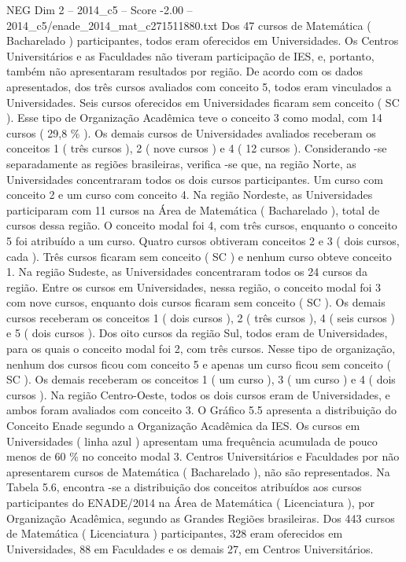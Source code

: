 \begin{textsample}{NEG Dim 2 – 2014\_c5 – Score -2.00 – 2014\_c5/enade\_2014\_mat\_c271511880.txt}
Dos 47 cursos de Matemática ( Bacharelado ) participantes, todos eram oferecidos em Universidades.
Os Centros Universitários e as Faculdades não tiveram participação de IES, e, portanto, também não apresentaram resultados por região.
De acordo com os dados apresentados, dos três cursos avaliados com conceito 5, todos eram vinculados a Universidades.
Seis cursos oferecidos em Universidades ficaram sem conceito ( SC ).
Esse tipo de Organização Acadêmica teve o conceito 3 como modal, com 14 cursos ( 29,8 \% ).
Os demais cursos de Universidades avaliados receberam os conceitos 1 ( três cursos ), 2 ( nove cursos ) e 4 ( 12 cursos ).
Considerando -se separadamente as regiões brasileiras, verifica -se que, na região Norte, as Universidades concentraram todos os dois cursos participantes.
Um curso com conceito 2 e um curso com conceito 4.
Na região Nordeste, as Universidades participaram com 11 cursos na Área de Matemática ( Bacharelado ), total de cursos dessa região.
O conceito modal foi 4, com três cursos, enquanto o conceito 5 foi atribuído a um curso.
Quatro cursos obtiveram conceitos 2 e 3 ( dois cursos, cada ).
Três cursos ficaram sem conceito ( SC ) e nenhum curso obteve conceito 1.
Na região Sudeste, as Universidades concentraram todos os 24 cursos da região.
Entre os cursos em Universidades, nessa região, o conceito modal foi 3 com nove cursos, enquanto dois cursos ficaram sem conceito ( SC ).
Os demais cursos receberam os conceitos 1 ( dois cursos ), 2 ( três cursos ), 4 ( seis cursos ) e 5 ( dois cursos ).
Dos oito cursos da região Sul, todos eram de Universidades, para os quais o conceito modal foi 2, com três cursos.
Nesse tipo de organização, nenhum dos cursos ficou com conceito 5 e apenas um curso ficou sem conceito ( SC ).
Os demais receberam os conceitos 1 ( um curso ), 3 ( um curso ) e 4 ( dois cursos ).
Na região Centro-Oeste, todos os dois cursos eram de Universidades, e ambos foram avaliados com conceito 3.
O Gráfico 5.5 apresenta a distribuição do Conceito Enade segundo a Organização Acadêmica da IES.
Os cursos em Universidades ( linha azul ) apresentam uma frequência acumulada de pouco menos de 60 \% no conceito modal 3.
Centros Universitários e Faculdades por não apresentarem cursos de Matemática ( Bacharelado ), não são representados.
Na Tabela 5.6, encontra -se a distribuição dos conceitos atribuídos aos cursos participantes do ENADE/2014 na Área de Matemática ( Licenciatura ), por Organização Acadêmica, segundo as Grandes Regiões brasileiras.
Dos 443 cursos de Matemática ( Licenciatura ) participantes, 328 eram oferecidos em Universidades, 88 em Faculdades e os demais 27, em Centros Universitários.

\end{textsample}

